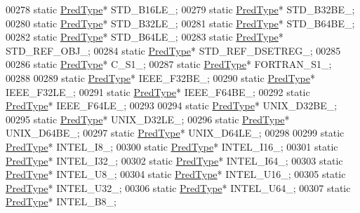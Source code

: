 \begin{DoxyCode}
00278         \textcolor{keyword}{static} \hyperlink{class_h5_1_1_pred_type}{PredType}* STD\_B16LE\_;
00279         \textcolor{keyword}{static} \hyperlink{class_h5_1_1_pred_type}{PredType}* STD\_B32BE\_;
00280         \textcolor{keyword}{static} \hyperlink{class_h5_1_1_pred_type}{PredType}* STD\_B32LE\_;
00281         \textcolor{keyword}{static} \hyperlink{class_h5_1_1_pred_type}{PredType}* STD\_B64BE\_;
00282         \textcolor{keyword}{static} \hyperlink{class_h5_1_1_pred_type}{PredType}* STD\_B64LE\_;
00283         \textcolor{keyword}{static} \hyperlink{class_h5_1_1_pred_type}{PredType}* STD\_REF\_OBJ\_;
00284         \textcolor{keyword}{static} \hyperlink{class_h5_1_1_pred_type}{PredType}* STD\_REF\_DSETREG\_;
00285 
00286         \textcolor{keyword}{static} \hyperlink{class_h5_1_1_pred_type}{PredType}* C\_S1\_;
00287         \textcolor{keyword}{static} \hyperlink{class_h5_1_1_pred_type}{PredType}* FORTRAN\_S1\_;
00288 
00289         \textcolor{keyword}{static} \hyperlink{class_h5_1_1_pred_type}{PredType}* IEEE\_F32BE\_;
00290         \textcolor{keyword}{static} \hyperlink{class_h5_1_1_pred_type}{PredType}* IEEE\_F32LE\_;
00291         \textcolor{keyword}{static} \hyperlink{class_h5_1_1_pred_type}{PredType}* IEEE\_F64BE\_;
00292         \textcolor{keyword}{static} \hyperlink{class_h5_1_1_pred_type}{PredType}* IEEE\_F64LE\_;
00293 
00294         \textcolor{keyword}{static} \hyperlink{class_h5_1_1_pred_type}{PredType}* UNIX\_D32BE\_;
00295         \textcolor{keyword}{static} \hyperlink{class_h5_1_1_pred_type}{PredType}* UNIX\_D32LE\_;
00296         \textcolor{keyword}{static} \hyperlink{class_h5_1_1_pred_type}{PredType}* UNIX\_D64BE\_;
00297         \textcolor{keyword}{static} \hyperlink{class_h5_1_1_pred_type}{PredType}* UNIX\_D64LE\_;
00298 
00299         \textcolor{keyword}{static} \hyperlink{class_h5_1_1_pred_type}{PredType}* INTEL\_I8\_;
00300         \textcolor{keyword}{static} \hyperlink{class_h5_1_1_pred_type}{PredType}* INTEL\_I16\_;
00301         \textcolor{keyword}{static} \hyperlink{class_h5_1_1_pred_type}{PredType}* INTEL\_I32\_;
00302         \textcolor{keyword}{static} \hyperlink{class_h5_1_1_pred_type}{PredType}* INTEL\_I64\_;
00303         \textcolor{keyword}{static} \hyperlink{class_h5_1_1_pred_type}{PredType}* INTEL\_U8\_;
00304         \textcolor{keyword}{static} \hyperlink{class_h5_1_1_pred_type}{PredType}* INTEL\_U16\_;
00305         \textcolor{keyword}{static} \hyperlink{class_h5_1_1_pred_type}{PredType}* INTEL\_U32\_;
00306         \textcolor{keyword}{static} \hyperlink{class_h5_1_1_pred_type}{PredType}* INTEL\_U64\_;
00307         \textcolor{keyword}{static} \hyperlink{class_h5_1_1_pred_type}{PredType}* INTEL\_B8\_;

\end{DoxyCode}
